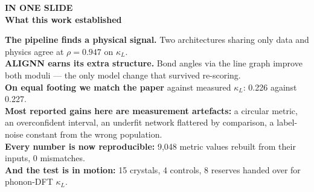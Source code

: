 \begin{frame}[plain]
\vspace{0.3cm}
\begin{center}
{\color{LightBlue}\bfseries\sffamily\large IN ONE SLIDE}\\[6pt]
{\color{white}\bfseries\headingfont\fontsize{24}{30}\selectfont
  What this work established}\\[10pt]
\begin{minipage}{0.82\linewidth}
{\color{Subtle}\sffamily\footnotesize
\textbf{\color{white}The pipeline finds a physical signal.} Two architectures
sharing only data and physics agree at $\rho = 0.947$ on $\kappa_L$.\\[6pt]
\textbf{\color{white}ALIGNN earns its extra structure.} Bond angles via the line
graph improve both moduli --- the only model change that survived
re-scoring.\\[6pt]
\textbf{\color{white}On equal footing we match the paper} against measured
$\kappa_L$: 0.226 against 0.227.\\[6pt]
\textbf{\color{white}Most reported gains here are measurement artefacts:} a
circular metric, an overconfident interval, an underfit network flattered by
comparison, a label-noise constant from the wrong population.\\[6pt]
\textbf{\color{white}Every number is now reproducible:} 9{,}048 metric values
rebuilt from their inputs, 0 mismatches.\\[6pt]
\textbf{\color{white}And the test is in motion:} 15 crystals, 4 controls, 8
reserves handed over for phonon-DFT $\kappa_L$.\par}
\end{minipage}
\end{center}
\end{frame}

